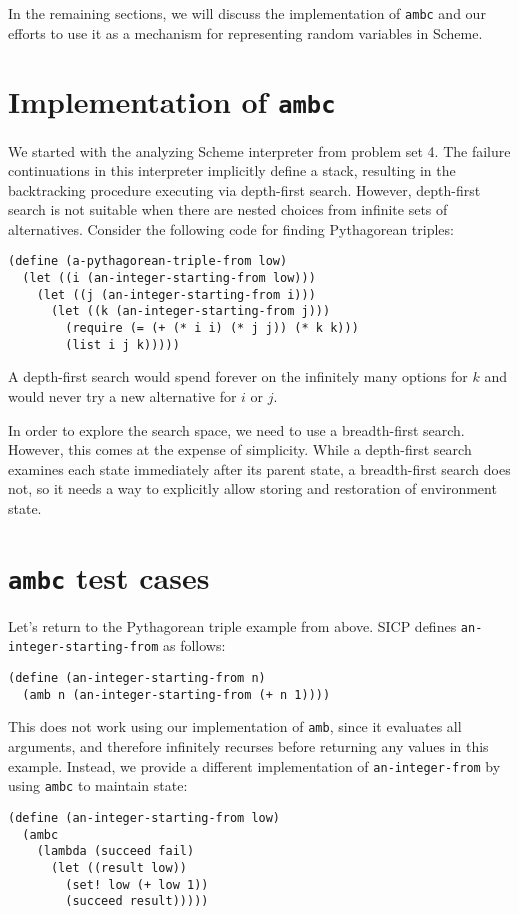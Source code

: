 \documentclass{article}
\begin{document}
In the remaining sections, we will discuss the implementation of
\texttt{ambc} and our efforts to use it as a mechanism for
representing random variables in Scheme.

\section{Implementation of \texttt{ambc}}

We started with the analyzing Scheme interpreter from problem set 4.  The
failure continuations in this interpreter implicitly define a stack, resulting
in the backtracking procedure executing via depth-first search.  However,
depth-first search is not suitable when there are nested choices from infinite
sets of alternatives. Consider the following code for finding Pythagorean
triples:
\begin{lstlisting}
(define (a-pythagorean-triple-from low)
  (let ((i (an-integer-starting-from low)))
    (let ((j (an-integer-starting-from i)))
      (let ((k (an-integer-starting-from j)))
        (require (= (+ (* i i) (* j j)) (* k k)))
        (list i j k)))))
\end{lstlisting}
A depth-first search would spend forever on the infinitely many options for $k$
and would never try a new alternative for $i$ or $j$.

In order to explore the search space, we need to use a breadth-first search.
However, this comes at the expense of simplicity. While a depth-first search
examines each state immediately after its parent state, a breadth-first search
does not, so it needs a way to explicitly allow storing and restoration of
environment state.

\section{\texttt{ambc} test cases}

Let's return to the Pythagorean triple example from above. SICP defines
\texttt{an-integer-starting-from} as follows:
\begin{lstlisting}
(define (an-integer-starting-from n)
  (amb n (an-integer-starting-from (+ n 1))))
\end{lstlisting}
This does not work using our implementation of \texttt{amb}, since it evaluates
all arguments, and therefore infinitely recurses before returning any values in
this example. Instead, we provide a different implementation of
\texttt{an-integer-from} by using \texttt{ambc} to maintain state:
\begin{lstlisting}
(define (an-integer-starting-from low)
  (ambc
    (lambda (succeed fail)
      (let ((result low))
        (set! low (+ low 1))
        (succeed result)))))
\end{lstlisting}
\end{document}

